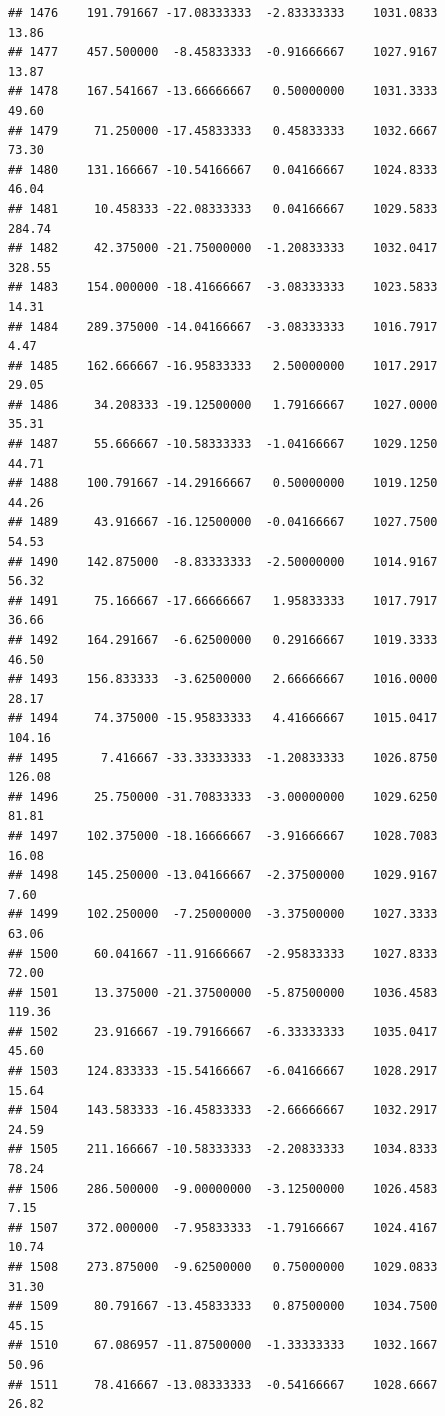 \documentclass[
]{article}
\begin{document}
\begin{verbatim}
## 1476    191.791667 -17.08333333  -2.83333333    1031.0833       13.86
## 1477    457.500000  -8.45833333  -0.91666667    1027.9167       13.87
## 1478    167.541667 -13.66666667   0.50000000    1031.3333       49.60
## 1479     71.250000 -17.45833333   0.45833333    1032.6667       73.30
## 1480    131.166667 -10.54166667   0.04166667    1024.8333       46.04
## 1481     10.458333 -22.08333333   0.04166667    1029.5833      284.74
## 1482     42.375000 -21.75000000  -1.20833333    1032.0417      328.55
## 1483    154.000000 -18.41666667  -3.08333333    1023.5833       14.31
## 1484    289.375000 -14.04166667  -3.08333333    1016.7917        4.47
## 1485    162.666667 -16.95833333   2.50000000    1017.2917       29.05
## 1486     34.208333 -19.12500000   1.79166667    1027.0000       35.31
## 1487     55.666667 -10.58333333  -1.04166667    1029.1250       44.71
## 1488    100.791667 -14.29166667   0.50000000    1019.1250       44.26
## 1489     43.916667 -16.12500000  -0.04166667    1027.7500       54.53
## 1490    142.875000  -8.83333333  -2.50000000    1014.9167       56.32
## 1491     75.166667 -17.66666667   1.95833333    1017.7917       36.66
## 1492    164.291667  -6.62500000   0.29166667    1019.3333       46.50
## 1493    156.833333  -3.62500000   2.66666667    1016.0000       28.17
## 1494     74.375000 -15.95833333   4.41666667    1015.0417      104.16
## 1495      7.416667 -33.33333333  -1.20833333    1026.8750      126.08
## 1496     25.750000 -31.70833333  -3.00000000    1029.6250       81.81
## 1497    102.375000 -18.16666667  -3.91666667    1028.7083       16.08
## 1498    145.250000 -13.04166667  -2.37500000    1029.9167        7.60
## 1499    102.250000  -7.25000000  -3.37500000    1027.3333       63.06
## 1500     60.041667 -11.91666667  -2.95833333    1027.8333       72.00
## 1501     13.375000 -21.37500000  -5.87500000    1036.4583      119.36
## 1502     23.916667 -19.79166667  -6.33333333    1035.0417       45.60
## 1503    124.833333 -15.54166667  -6.04166667    1028.2917       15.64
## 1504    143.583333 -16.45833333  -2.66666667    1032.2917       24.59
## 1505    211.166667 -10.58333333  -2.20833333    1034.8333       78.24
## 1506    286.500000  -9.00000000  -3.12500000    1026.4583        7.15
## 1507    372.000000  -7.95833333  -1.79166667    1024.4167       10.74
## 1508    273.875000  -9.62500000   0.75000000    1029.0833       31.30
## 1509     80.791667 -13.45833333   0.87500000    1034.7500       45.15
## 1510     67.086957 -11.87500000  -1.33333333    1032.1667       50.96
## 1511     78.416667 -13.08333333  -0.54166667    1028.6667       26.82

\end{verbatim}
\end{document}
